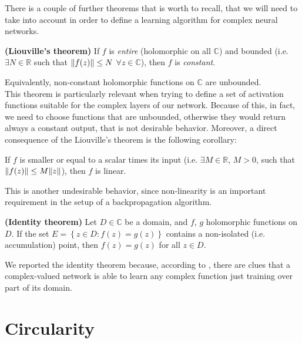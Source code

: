 \documentclass[../main.tex]{subfiles}
\begin{document}
There is a couple of further theorems that is worth to recall, that we will need to take into account in order to define a learning algorithm for complex neural networks.
\begin{theorem}
\textbf{(Liouville's theorem)} If $f$ is \textit{entire} (holomorphic on all $\mathds{C}$) and bounded (i.e. $\exists N\in\mathds{R}$ such that $\norm{f(z)}\leq N$ $\forall z\in\mathds{C}$), then $f$ is \textit{constant}.
\label{th:Liouville}
\end{theorem}
Equivalently, non-constant holomorphic functions on $\mathds{C}$ are unbounded.\\
This theorem is particularly relevant when trying to define a set of activation functions suitable for the complex layers of our network. Because of this, in fact, we need to choose functions that are unbounded, otherwise they would return always a constant output, that is not desirable behavior. Moreover, a direct consequence of the Liouville's theorem is the following corollary:
\begin{corollary}
If $f$ is smaller or equal to a scalar times its input (i.e. $\exists M\in\mathds{R}$, $M>0$, such that $\norm{f(z)}\leq M\norm{z}$), then $f$ is linear.
\end{corollary}
This is another undesirable behavior, since non-linearity is an important requirement in the setup of a backpropagation algorithm.
\begin{theorem}
\textbf{(Identity theorem)} Let $D\in\mathds{C}$ be a domain, and $f$, $g$ holomorphic functions on $D$. If the set $E = \left\{z\in D: f(z)=g(z)\right\}$ contains a non-isolated (i.e. accumulation) point, then $f(z)=g(z)$ for all $z\in D$.
\label{th:identity}
\end{theorem}
We reported the identity theorem because, according to \cite{Nitta_complexBP}, there are clues that a complex-valued network is able to learn any complex function just training over part of its domain.

\section{Circularity}
\end{document}
